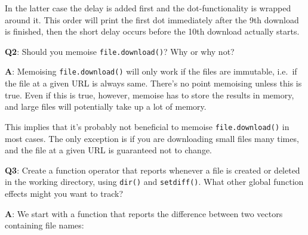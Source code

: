 \documentclass[
]{krantz}
\begin{document}
In the latter case the delay is added first and the dot-functionality is wrapped around it. This order will print the first dot immediately after the 9th download is finished, then the short delay occurs before the 10th download actually starts.

\textbf{{Q2}}: Should you memoise \texttt{file.download()}? Why or why not?

\textbf{{A}}: Memoising \texttt{file.download()} will only work if the files are immutable, i.e.~if the file at a given URL is always same. There's no point memoising unless this is true. Even if this is true, however, memoise has to store the results in memory, and large files will potentially take up a lot of memory.

This implies that it's probably not beneficial to memoise \texttt{file.download()} in most cases. The only exception is if you are downloading small files many times, and the file at a given URL is guaranteed not to change.

\textbf{{Q3}}: Create a function operator that reports whenever a file is created or deleted in the working directory, using \texttt{dir()} and \texttt{setdiff()}. What other global function effects might you want to track?

\textbf{{A}}: We start with a function that reports the difference between two vectors containing file names:
\end{document}
